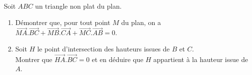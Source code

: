 \documentclass[a4paper, 11pt]{article}
\begin{document}
\begin{exercice}  \;
	Soit $ABC$ un triangle non plat du plan.
	\begin{enumerate}
		\item D\'emontrer que, pour tout point $M$ du plan, on a $\overrightarrow{MA}.\overrightarrow{BC} + \overrightarrow{MB}.\overrightarrow{CA} + \overrightarrow{MC}.\overrightarrow{AB} = 0$.
		\item Soit $H$ le point d'intersection des hauteurs issues de $B$ et $C$. \\
		      Montrer que $\overrightarrow{HA}.\overrightarrow{BC} = 0$ et en d\'eduire que $H$ appartient \`a la hauteur issue de $A$.
	\end{enumerate}
\end{exercice}
\end{document}
